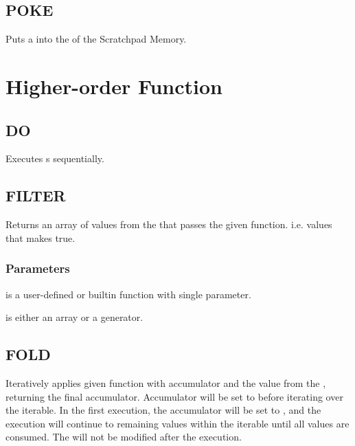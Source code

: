     \subsection{POKE}
        \par
        Puts a  into the  of the Scratchpad Memory.

\section{Higher-order Function}

    \subsection{DO}
        \par
        Executes s sequentially.
    \subsection{FILTER}
        \par
        Returns an array of values from the  that passes the given function. i.e. values that makes  true.
        \subsubsection*{Parameters}
        \begin{itemlist}
        \item {} is a user-defined or builtin function with single parameter.
        \item {} is either an array or a generator.
        \end{itemlist}
    \subsection{FOLD}
        \par
        Iteratively applies given function with accumulator and the value from the , returning the final accumulator. Accumulator will be set to  before iterating over the iterable. In the first execution, the accumulator will be set to , and the execution will continue to remaining values within the iterable until all values are consumed. The  will not be modified after the execution.
